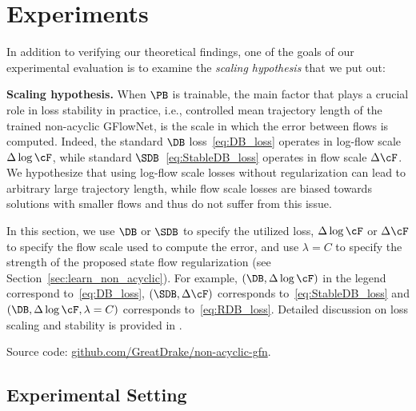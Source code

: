 

\vspace{-0.2cm}
\section{Experiments}
\label{sec:experiments}

In addition to verifying our theoretical findings, one of the goals of our experimental evaluation is to examine the \textit{scaling hypothesis} that we put out:

\begin{tcolorbox}[colback=colorblue,
    colframe=black,
    arc=4pt,
    boxsep=0.3pt,
]%
\textbf{Scaling hypothesis.} When $\PB$ is trainable, the main factor that plays a crucial role in loss stability in practice, i.e., controlled mean trajectory length of the trained non-acyclic GFlowNet, is the scale in which the error between flows is computed. Indeed, the standard $\DB$ loss~\eqref{eq:DB_loss} operates in log-flow scale $\Delta \log \cF$, while standard $\SDB$~\eqref{eq:StableDB_loss} operates in flow scale $\Delta \cF$. We hypothesize that using log-flow scale losses without regularization can lead to arbitrary large trajectory length, while flow scale losses are biased towards solutions with smaller flows and thus do not suffer from this issue.
\end{tcolorbox}

In this section, we use $\DB$ or $\SDB$ to specify the utilized loss, $\Delta \log \cF$ or $\Delta \cF$ to specify the flow scale used to compute the error, and use $\lambda = C$ to specify the strength of the proposed state flow regularization (see Section~\ref{sec:learn_non_acyclic}). For example, $(\DB, \Delta \log \cF)$ in the legend correspond to~\eqref{eq:DB_loss}, $(\SDB, \Delta \cF)$ corresponds to~\eqref{eq:StableDB_loss} and $(\DB, \Delta \log \cF, \lambda=C)$ corresponds to~\eqref{eq:RDB_loss}. Detailed discussion on loss scaling and stability is provided in . 

Source code: \href{https://github.com/GreatDrake/non-acyclic-gfn}{github.com/GreatDrake/non-acyclic-gfn}.



\subsection{Experimental Setting}
\label{sec:exp_setup}

